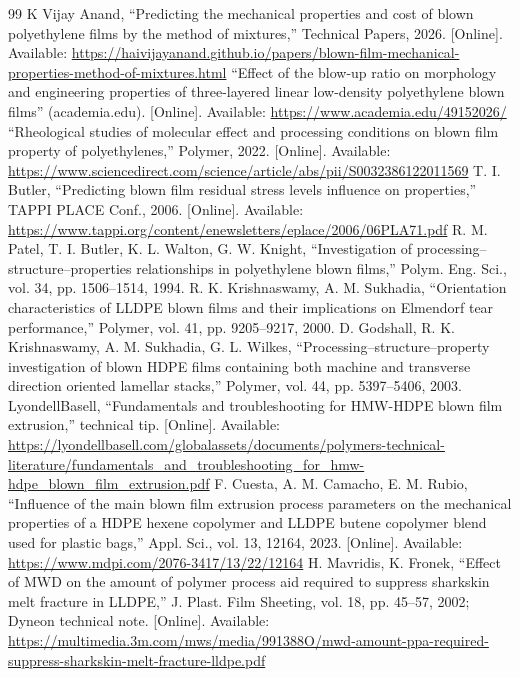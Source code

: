 \documentclass[conference,a4paper]{IEEEtran}
\begin{document}
\begin{thebibliography}{99}
\footnotesize
{} K Vijay Anand, “Predicting the mechanical properties and cost of blown polyethylene films by the method of mixtures,” Technical Papers, 2026. [Online]. Available: \url{https://haivijayanand.github.io/papers/blown-film-mechanical-properties-method-of-mixtures.html}
 “Effect of the blow-up ratio on morphology and engineering properties of three-layered linear low-density polyethylene blown films” (academia.edu). [Online]. Available: \url{https://www.academia.edu/49152026/}
 “Rheological studies of molecular effect and processing conditions on blown film property of polyethylenes,” Polymer, 2022. [Online]. Available: \url{https://www.sciencedirect.com/science/article/abs/pii/S0032386122011569}
 T. I. Butler, “Predicting blown film residual stress levels influence on properties,” TAPPI PLACE Conf., 2006. [Online]. Available: \url{https://www.tappi.org/content/enewsletters/eplace/2006/06PLA71.pdf}
 R. M. Patel, T. I. Butler, K. L. Walton, G. W. Knight, “Investigation of processing–structure–properties relationships in polyethylene blown films,” Polym. Eng. Sci., vol. 34, pp. 1506–1514, 1994.
 R. K. Krishnaswamy, A. M. Sukhadia, “Orientation characteristics of LLDPE blown films and their implications on Elmendorf tear performance,” Polymer, vol. 41, pp. 9205–9217, 2000.
 D. Godshall, R. K. Krishnaswamy, A. M. Sukhadia, G. L. Wilkes, “Processing–structure–property investigation of blown HDPE films containing both machine and transverse direction oriented lamellar stacks,” Polymer, vol. 44, pp. 5397–5406, 2003.
 LyondellBasell, “Fundamentals and troubleshooting for HMW-HDPE blown film extrusion,” technical tip. [Online]. Available: \url{https://lyondellbasell.com/globalassets/documents/polymers-technical-literature/fundamentals_and_troubleshooting_for_hmw-hdpe_blown_film_extrusion.pdf}
 F. Cuesta, A. M. Camacho, E. M. Rubio, “Influence of the main blown film extrusion process parameters on the mechanical properties of a HDPE hexene copolymer and LLDPE butene copolymer blend used for plastic bags,” Appl. Sci., vol. 13, 12164, 2023. [Online]. Available: \url{https://www.mdpi.com/2076-3417/13/22/12164}
 H. Mavridis, K. Fronek, “Effect of MWD on the amount of polymer process aid required to suppress sharkskin melt fracture in LLDPE,” J. Plast. Film Sheeting, vol. 18, pp. 45–57, 2002; Dyneon technical note. [Online]. Available: \url{https://multimedia.3m.com/mws/media/991388O/mwd-amount-ppa-required-suppress-sharkskin-melt-fracture-lldpe.pdf}

\end{thebibliography}
\end{document}
